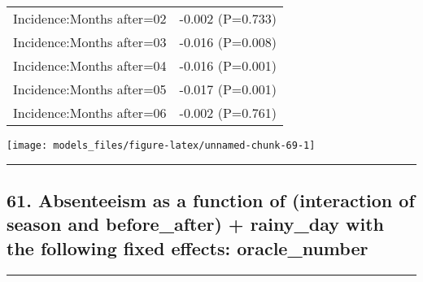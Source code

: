 \documentclass[]{article}
\begin{document}
\begin{longtable}[t]{ll}
\hspace{1em}Incidence:Months after=02 & -0.002 (P=0.733)\\
\hspace{1em}Incidence:Months after=03 & -0.016 (P=0.008)\\
\hspace{1em}Incidence:Months after=04 & -0.016 (P=0.001)\\
\hspace{1em}Incidence:Months after=05 & -0.017 (P=0.001)\\
\hspace{1em}Incidence:Months after=06 & -0.002 (P=0.761)\\*
\end{longtable}

\begin{center}\texttt{[image: models\_files/figure-latex/unnamed-chunk-69-1]} \end{center}

\newpage

\begin{center}\rule{0.5\linewidth}{\linethickness}\end{center}

\subsection{61. Absenteeism as a function of (interaction of season and
before\_after) + rainy\_day with the following fixed effects:
oracle\_number}\label{absenteeism-as-a-function-of-interaction-of-season-and-before_after-rainy_day-with-the-following-fixed-effects-oracle_number-1}

\begin{center}\rule{0.5\linewidth}{\linethickness}\end{center}
\end{document}
